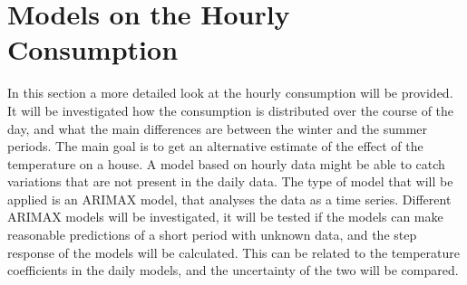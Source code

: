 \chapter{Models on the Hourly Consumption}
\label{chap: hourly}
In this section a more detailed look at the hourly consumption will be provided. It will be investigated how the consumption is distributed over the course of the day, and what the main differences are between the winter and the summer periods. The main goal is to get an alternative estimate of the effect of the temperature on a house. A model based on hourly data might be able to catch variations that are not present in the daily data. The type of model that will be applied is an ARIMAX model, that analyses the data as a time series. Different ARIMAX models will be investigated, it will be tested if the models can make reasonable predictions of a short period with unknown data, and the step response of the models will be calculated. This can be related to the temperature coefficients in the daily models, and the uncertainty of the two will be compared.

